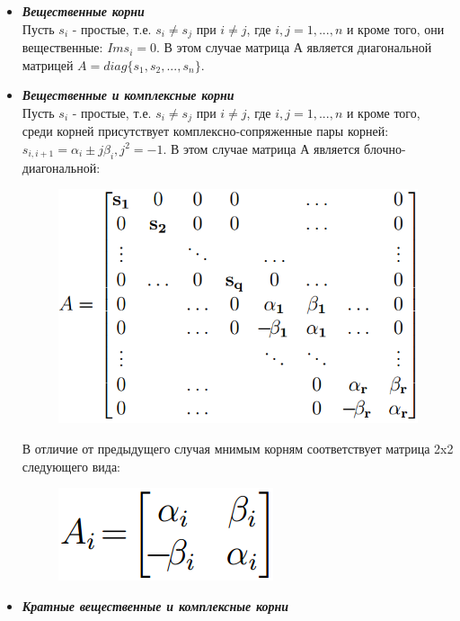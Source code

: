 \documentclass[14pt,a4paper,report]{report}
\begin{document}
\begin{itemize}
	\item \emph{\textbf{Вещественные корни}}\\
	Пусть $s_i$ - простые, т.е. $s_i\neq s_j$ при $i\neq j$, где $i,j=1,...,n$ и кроме того, они вещественные: $Im s_i=0$. В этом случае матрица А является диагональной матрицей $A=diag\{s_1, s_2,..., s_n\}$.
	
	\item \emph{\textbf{Вещественные и комплексные корни}}\\
	Пусть $s_i$ - простые, т.е. $s_i\neq s_j$ при $i\neq j$, где $i,j=1,...,n$ и кроме того, среди корней присутствует комплексно-сопряженные пары корней: $s_{i,i+1}=\alpha_i\pm j\beta_i, j^2=-1$. В этом случае матрица А является блочно-диагональной:
	
	\begin{figure}[h!]
		\centering
		\includegraphics[scale = 0.50]{images/1.png}
		\label{image:1}
	\end{figure}
	
	В отличие от предыдущего случая мнимым корням соответствует матрица 2x2 следующего вида:
	
	\begin{figure}[h!]
		\centering
		\includegraphics[scale = 0.57]{images/2.png}
		\label{image:2}
	\end{figure}
	
	\item \emph{\textbf{Кратные вещественные и комплексные корни}}
	

\end{itemize}
\end{document}

